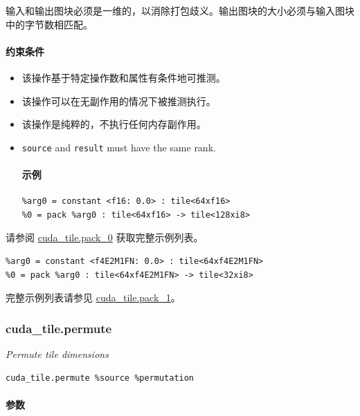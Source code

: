 \documentclass{article}
\begin{document}
输入和输出图块必须是一维的，以消除打包歧义。输出图块的大小必须与输入图块中的字节数相匹配。



\paragraph{约束条件}

\begin{itemize}
\item 该操作基于特定操作数和属性有条件地可推测。
\item 该操作可以在无副作用的情况下被推测执行。
\item 该操作是纯粹的，不执行任何内存副作用。
\item \texttt{source} and \texttt{result} must have the same rank.


\paragraph{示例}

\begin{lstlisting}
%arg0 = constant <f16: 0.0> : tile<64xf16>
%0 = pack %arg0 : tile<64xf16> -> tile<128xi8>
\end{lstlisting}

\end{itemize}
请参阅 \href{https://docs.nvidia.com/cuda/tile-ir/latest/sections/appendix.html#example-cuda-tile-pack-0}{cuda\_tile.pack\_0} 获取完整示例列表。


\begin{lstlisting}
%arg0 = constant <f4E2M1FN: 0.0> : tile<64xf4E2M1FN>
%0 = pack %arg0 : tile<64xf4E2M1FN> -> tile<32xi8>
\end{lstlisting}

完整示例列表请参见 \href{https://docs.nvidia.com/cuda/tile-ir/latest/sections/appendix.html#example-cuda-tile-pack-1}{cuda\_tile.pack\_1}。



\subsubsection{cuda\_tile.permute}

\textit{Permute tile dimensions}


\begin{lstlisting}
cuda_tile.permute %source %permutation
\end{lstlisting}

\paragraph{参数}
\end{document}
